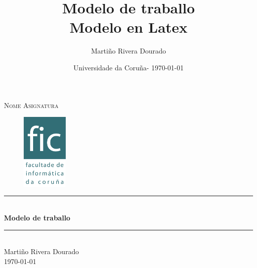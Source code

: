 \documentclass[12pt]{article}
\begin{document}
\title{%
	Modelo de traballo\\
	\large Modelo en Latex\\}

\author{Martiño Rivera Dourado}

\date{Universidade da Coruña- \today}


\begin{titlepage}

\newcommand{\HRule}{\rule{\linewidth}{0.5mm}} %

\center %
 

\textsc{\Large Nome Asignatura}\\[1cm]

\begin{figure}[!h]
	\centering
	\includegraphics[width=0.2\textwidth]{logo.png}
\end{figure}


\HRule \\[0.4cm]
{ \huge \bfseries Modelo de traballo}\\[0.4cm]
\HRule \\[1.5cm]
 

	Martiño Rivera Dourado\\[3cm]


{\large \today}\\[2cm] 
 

\vfill %

\end{titlepage}

\tableofcontents
\clearpage



\clearpage


 
\end{document}
